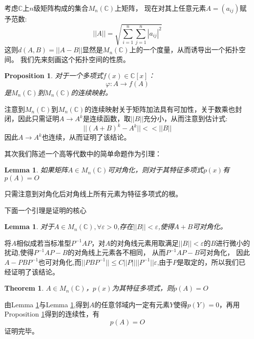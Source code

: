 \documentclass[a4paper,12pt]{ctexart}
\newenvironment{prooff}{{\noindent\it\textcolor{cyan!40!black}{Proof}:}\quad}{\par}
\newtheorem{theo}[defn]{Theorem}
\newtheorem{lem}[defn]{Lemma}
\newtheorem{prop}[defn]{Proposition}
\begin{document}
考虑$\mathbb{C}$上$n$级矩阵构成的集合$M_n(\mathbb{C})$上矩阵，
现在对其上任意元素$A=(a_{ij})$赋予范数:
\begin{equation*}
    ||A||=\sqrt{\sum_{i=1}^{n}\sum_{j=1}^{n}|a_{ij}|^2}
\end{equation*}
这则$d(A,B)=||A-B||$显然是$M_n(\mathbb{C})$上的一个度量，从而诱导出一个拓扑空间。
我们先来刻画这个拓扑空间的性质。
\begin{prop}
    对于一个多项式$f(x)\in \mathbb{C}[x]$：\begin{equation*}
        \varphi: A\rightarrow f(A)
    \end{equation*}
    是$M_n(\mathbb{C})$到$M_n(\mathbb{C})$的连续映射。\label{prop3.1}
\end{prop}
\begin{prooff}
    注意到$M_n(\mathbb{C})$到$M_n(\mathbb{C})$的连续映射关于矩阵加法具有可加性，关于数乘也封闭，因此只需证明$A\rightarrow A^{k}$是连续函数，取$||B||$充分小，从而注意到估计式:
    \begin{equation*}
        ||(A+B)^k-A^k||<< ||B||
    \end{equation*}
    因此$A\rightarrow A^{k}$也连续，从而证明了该结论。
\end{prooff}
其次我们陈述一个高等代数中的简单命题作为引理：
\begin{lem}
    如果矩阵$A\in M_n(\mathbb{C})$可对角化，则对于其特征多项式$p(x)$有$p(A)=O$\label{lem3.1}
\end{lem}
\begin{prooff}
    只需注意到对角化后对角线上所有元素为特征多项式的根。
\end{prooff}
下面一个引理是证明的核心
\begin{lem}
    对于$A\in M_n(\mathbb{C}),\forall \varepsilon>0$,存在$||B||<\varepsilon$,使得$A+B$可对角化。\label{lem3.2}
\end{lem}
\begin{prooff}
    将$A$相似成若当标准型$P^{-1}AP$，对$A$的对角线元素用取满足$||B||<\varepsilon$的$B$进行微小的扰动,使得$P^{-1}AP-B$的对角线上元素各不相同，
    从而$P^{-1}AP-B$可对角化，
    因此$A-PBP^{-1}$也可对角化,而$||PBP^{-1}||\le C||P||||P^{-1}||\varepsilon$,由于$P$是取定的，所以我们已经证明了该结论。
\end{prooff}
\begin{theo}
    $A\in M_n(\mathbb{C})$，$p(x)$为其特征多项式，则$p(A)=O$
\end{theo}
\begin{prooff}
    由Lemma \ref{lem3.1}与Lemma \ref{lem3.2},得到$A$的任意邻域内一定有元素$Y$使得$p(Y)=0$，再用Proposition \ref{prop3.1}得到的连续性，有\begin{equation*}
        p(A)=O
    \end{equation*}证明完毕。
\end{prooff}
\end{document}
